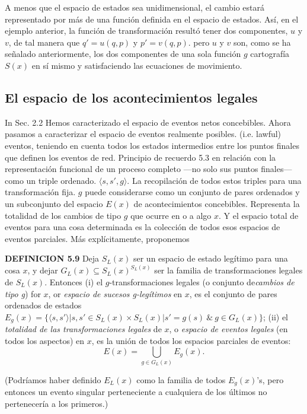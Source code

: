 \begin{justifying}
    A menos que el espacio de estados sea unidimensional, el cambio estará   representado por más de una función definida en el espacio de estados. Así, en el ejemplo anterior, la función de transformación resultó tener dos componentes, $u$ y $v$, de tal manera que $q' = u(q, p)$ y $p' = v(q, p)$. pero $u$  y $v$ son, como se ha señalado anteriormente, los dos componentes de una sola función $g$ cartografía $S(x)$ en sí mismo y satisfaciendo las ecuaciones de movimiento.
    
    \subsection{El espacio de los acontecimientos legales}

    In Sec. 2.2 Hemos caracterizado el espacio de eventos netos concebibles. Ahora pasamos a caracterizar el espacio de eventos realmente posibles. (i.e. lawful) eventos, teniendo en cuenta todos los estados intermedios entre los puntos finales que definen los eventos de red. Principio de recuerdo 5.3 en relación con la representación funcional de un proceso completo —no solo sus puntos finales— como un triple ordenado. $\langle s, s', g \rangle$. La recopilación de todos estos triples para una transformación fija. $g$ puede considerarse como un conjunto de pares ordenados y un subconjunto del espacio $E(x)$ de acontecimientos concebibles. Representa la totalidad de los cambios de tipo $g$ que ocurre en o a algo $x$. Y el espacio total de eventos para una cosa determinada es la colección de todos esos espacios de eventos parciales. Más explícitamente, proponemos

    \textbf{DEFINICION 5.9} Deja $S_L(x)$ ser un espacio de estado legítimo para una cosa $x$, y dejar $G_L(x) \subseteq S_L(x)^{S_L(x)}$ ser la familia de transformaciones legales de $S_L(x)$. Entonces
    (i) el $g$-transformaciones legales (o conjunto de\textit{cambios de tipo g})   for $x$, or \textit{espacio de sucesos g-legítimos} en $x$, es el conjunto de     pares ordenados de estados
    $E_g(x) = \{ \langle s, s' \rangle | s, s' \in S_L(x) \times S_L(x) | s' = g    (s) \ \& \ g \in G_L(x) \}$;
    (ii) el \textit{totalidad de las transformaciones legales} de $x$, o \textit    {espacio de eventos legales} (en todos los aspectos) en $x$, es la unión de     todos los espacios parciales de eventos:
    \[ E(x) = \bigcup_{g \in G_L(x)} E_g(x). \]

    (Podríamos haber definido $E_L(x)$ como la familia de todos $E_g(x)$'s, pero    entonces un evento singular perteneciente a cualquiera de los últimos no   pertenecería a los primeros.)


\end{justifying}
